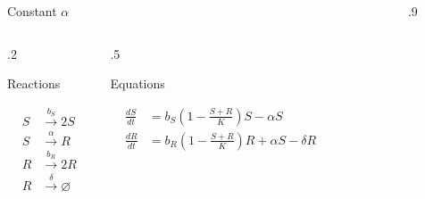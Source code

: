 \documentclass[final]{beamer}
\newlength{\sepwid}
\newlength{\onecolwid}
\begin{document}
\begin{frame}[t]
\begin{block}
\begin{columns}[t]
\begin{column}{\onecolwid}
\begin{block}{Constant $\alpha$}
  \begin{columns}[t]
    \begin{column}{.2\onecolwid}
      \begin{center}
        Reactions
      \end{center}
      \begin{align*}
        S & \stackrel{b_S}{\rightarrow} 2S \\
        S & \stackrel{\alpha}{\rightarrow}  R \\
        R & \stackrel{b_R}{\rightarrow} 2R \\
        R & \stackrel{\delta}{\rightarrow} \varnothing
      \end{align*}
    \end{column}
      \vrule
    \begin{column}{.5\onecolwid}
      \begin{center}
        Equations
      \end{center}

      \begin{align*}
        \frac{dS}{dt}& = b_S \left(1 - \frac{S + R}{K}\right)S - \alpha S \\[0.5ex]
        \frac{dR}{dt}& = b_R \left(1 - \frac{S + R}{K}\right)R + \alpha S - \delta R
      \end{align*}

      \vspace{.9\baselineskip}
      \vspace{.9\baselineskip}
    \end{column}
  \end{columns}

  \end{block}
\end{column}

\vrule width 5pt
\begin{column}{\sepwid}\end{column} %

\begin{column}{.9\onecolwid}


\end{column}
\end{columns}
\end{block}
\end{frame}
\end{document}
